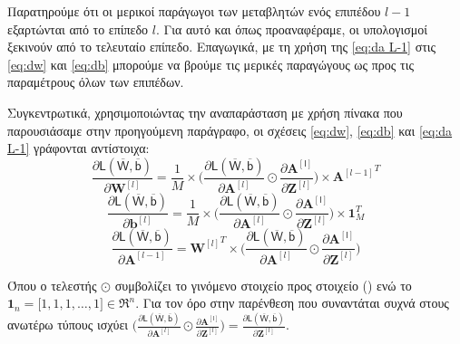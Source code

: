 Παρατηρούμε ότι οι μερικοί παράγωγοι των μεταβλητών ενός επιπέδου $l-1$ εξαρτώνται από το επίπεδο $l$. Για αυτό και όπως προαναφέραμε, οι υπολογισμοί ξεκινούν από το τελευταίο επίπεδο. Επαγωγικά, με τη χρήση της \ref{eq:da L-1} στις \ref{eq:dw} και \ref{eq:db} μπορούμε να βρούμε τις μερικές παραγώγους ως προς τις παραμέτρους όλων των επιπέδων.\par

Συγκεντρωτικά, χρησιμοποιώντας την αναπαράσταση με χρήση πίνακα που παρουσιάσαμε στην προηγούμενη παράγραφο, οι σχέσεις \ref{eq:dw}, \ref{eq:db} και \ref{eq:da L-1} γράφονται αντίστοιχα\cite{youtubeANG}:
\begin{equation}\label{eq:_bw}
  \frac{\partial \mathsf{L(\overline{W},\overline{b})}}{{\partial \boldsymbol{W}^{[l]}}} = \frac{1}{M} \times \big(\frac{\partial \mathsf{L(\overline{W},\overline{b})}}{\partial \boldsymbol{A}^{[l]}} \odot \frac{\partial \mathsf{{\boldsymbol{A}^{[l]}}}}{\partial \boldsymbol{Z}^{[l]}} \big) \times {\boldsymbol{A}^{[l-1]}}^T
\end{equation}
\begin{equation}\label{eq:_bb}
  \frac{\partial \mathsf{L(\overline{W},\overline{b})}}{\partial \boldsymbol{b}^{[l]}} = \frac{1}{M} \times \big(\frac{\partial \mathsf{L(\overline{W},\overline{b})}}{\partial \boldsymbol{A}^{[l]}} \odot \frac{\partial \mathsf{{\boldsymbol{A}^{[l]}}}}{\partial \boldsymbol{Z}^{[l]}} \big) \times \boldsymbol{1}_M^T
\end{equation}
\begin{equation}\label{eq:_ba}
  \frac{\partial \mathsf{L(\overline{W},\overline{b})}}{{\partial \boldsymbol{A}^{[l-1]}}} =  {\boldsymbol{W}^{[l]}}^T\times \big(\frac{\partial \mathsf{L(\overline{W},\overline{b})}}{\partial \boldsymbol{A}^{[l]}} \odot \frac{\partial \mathsf{{\boldsymbol{A}^{[l]}}}}{\partial \boldsymbol{Z}^{[l]}} \big) 
\end{equation}

Όπου ο τελεστής $\odot$ συμβολίζει το γινόμενο στοιχείο προς στοιχείο () ενώ το $\boldsymbol{1}_n = \big[1, 1, 1, \dots, 1\big] \in \Re^n$. Για τον όρο στην παρένθεση που συναντάται συχνά στους ανωτέρω τύπους ισχύει $\big(\frac{\partial \mathsf{L(\overline{W},\overline{b})}}{\partial \boldsymbol{A}^{[l]}} \odot \frac{\partial \mathsf{{\boldsymbol{A}^{[l]}}}}{\partial \boldsymbol{Z}^{[l]}} \big) = \frac{\partial \mathsf{L(\overline{W},\overline{b})}}{{\partial \boldsymbol{Z}^{[l]}}}$. \par

